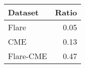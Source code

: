 \begin{tabular}{lr}
\toprule
Dataset & Ratio \\
\midrule
Flare & 0.05 \\
CME & 0.13 \\
Flare-CME & 0.47 \\
\bottomrule
\end{tabular}

